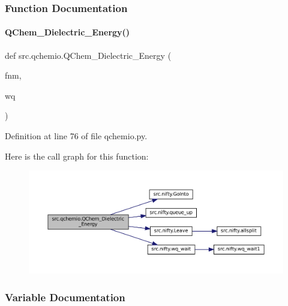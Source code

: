 \subsubsection{Function Documentation}
\mbox{\label{namespacesrc_1_1qchemio_a6d8c4a784dca15418d6e89fbde845611}} 
\paragraph{\texorpdfstring{Q\+Chem\+\_\+\+Dielectric\+\_\+\+Energy()}{QChem\_Dielectric\_Energy()}}
{\footnotesize\ttfamily def src.\+qchemio.\+Q\+Chem\+\_\+\+Dielectric\+\_\+\+Energy (\begin{DoxyParamCaption}\item[{}]{fnm,  }\item[{}]{wq }\end{DoxyParamCaption})}



Definition at line 76 of file qchemio.\+py.

Here is the call graph for this function\+:
\nopagebreak
\begin{figure}[H]
\begin{center}
\leavevmode
\includegraphics[width=350pt]{namespacesrc_1_1qchemio_a6d8c4a784dca15418d6e89fbde845611_cgraph}
\end{center}
\end{figure}


\subsubsection{Variable Documentation}
\mbox{\label{namespacesrc_1_1qchemio_afb2d0a18f630955d2ad00ba5a97889bc}} 
